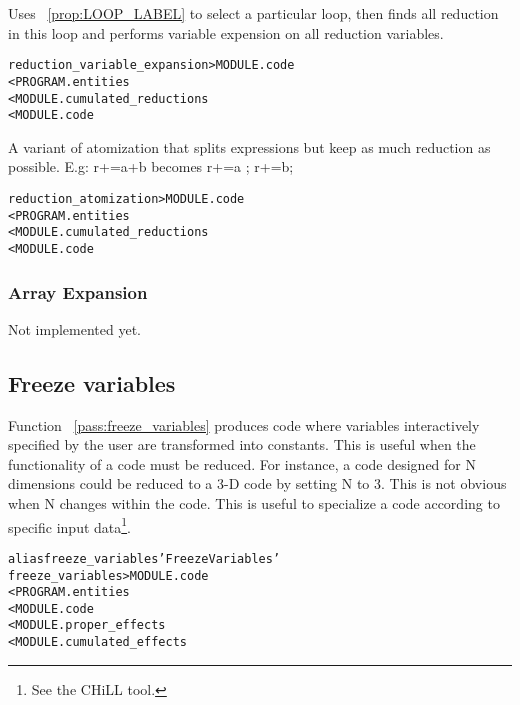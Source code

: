 \documentclass[a4paper]{report}
\newenvironment{PipsMake}{\begin{alltt}}{\end{alltt}}
\newcommand{\PipsPropRef}[1]{\texttt{\detokenize{#1}}~\ref{prop:#1}}
\newcommand{\PipsPassRef}[1]{\texttt{\detokenize{#1}}~\ref{pass:#1}}
\newenvironment{PipsPass}[1]{\label{pass:#1}}{}
\begin{document}
\begin{PipsPass}{reduction_variable_expansion}
Uses \PipsPropRef{LOOP_LABEL} to select a particular loop,
then finds all reduction in this loop and performs variable expension on all reduction variables.
\end{PipsPass}

\begin{PipsMake}
reduction_variable_expansion      > MODULE.code
        < PROGRAM.entities
        < MODULE.cumulated_reductions
        < MODULE.code
\end{PipsMake}

\begin{PipsPass}{reduction_atomization}
  A variant of atomization that splits expressions but keep as much
  reduction as possible. E.g: r+=a+b becomes r+=a ; r+=b;
\end{PipsPass}

\begin{PipsMake}
reduction_atomization      > MODULE.code
        < PROGRAM.entities
        < MODULE.cumulated_reductions
        < MODULE.code
\end{PipsMake}

\subsubsection{Array Expansion}

Not implemented yet.

\subsection{Freeze variables}
\label{subsection-freeze-variables}

\begin{PipsPass}{freeze_variables}
Function \PipsPassRef{freeze_variables} produces code where variables
interactively specified by the user are transformed into
constants. This is useful when the functionality of a code must be
reduced. For instance, a code designed for N dimensions could be
reduced to a 3-D code by setting N to 3. This is not obvious when N
changes within the code.  This is useful to specialize
a code according to specific input data\footnote{See the CHiLL tool.}.
\end{PipsPass}

\begin{PipsMake}
alias freeze_variables 'Freeze Variables'
freeze_variables                   > MODULE.code
        < PROGRAM.entities
        < MODULE.code
        < MODULE.proper_effects
        < MODULE.cumulated_effects
\end{PipsMake}
\end{document}
